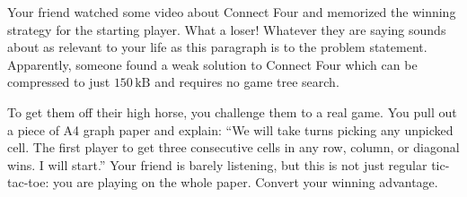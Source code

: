 \newcommand{\maxr}{59}
\newcommand{\maxc}{42}


Your friend watched some video about Connect Four and memorized the winning
strategy for the starting player. What a loser!
Whatever they are saying sounds about as relevant to your life
as this paragraph is to the problem statement.
Apparently, someone found a weak solution to Connect Four which can be
compressed to just $150\,\textrm{kB}$ and requires no game tree search.

To get them off their high horse, you challenge them to a real game.
You pull out a piece of A4 graph paper and explain:
``We will take turns picking any unpicked cell.
The first player to get three consecutive cells in any row, column, or diagonal wins.
I will start.''
Your friend is barely listening, but this is not just regular tic-tac-toe:
you are playing on the whole paper.
Convert your winning advantage.

